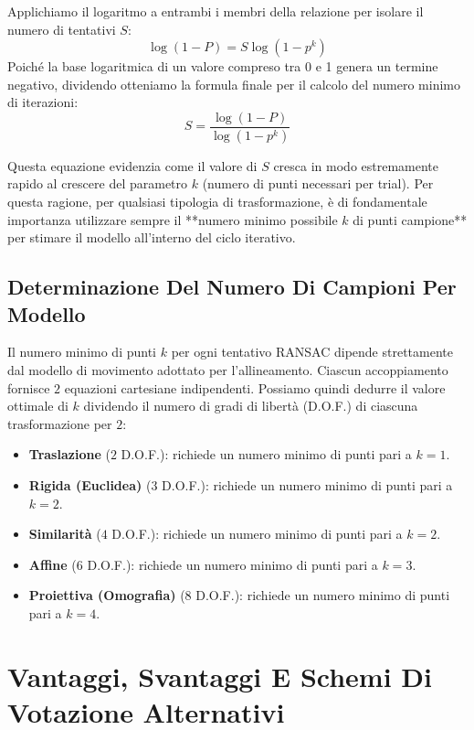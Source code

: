 ﻿\documentclass[11pt, a4paper]{article}
\begin{document}
Applichiamo il logaritmo a entrambi i membri della relazione per isolare il numero di tentativi $S$:
\[
\log(1 - P) = S \log\left(1 - p^k\right)
\]
Poiché la base logaritmica di un valore compreso tra 0 e 1 genera un termine negativo, dividendo otteniamo la formula finale per il calcolo del numero minimo di iterazioni:
\[
\boxed{S = \frac{\log(1 - P)}{\log\left(1 - p^k\right)}}
\]

Questa equazione evidenzia come il valore di $S$ cresca in modo estremamente rapido al crescere del parametro $k$ (numero di punti necessari per trial). Per questa ragione, per qualsiasi tipologia di trasformazione, è di fondamentale importanza utilizzare sempre il **numero minimo possibile $k$ di punti campione** per stimare il modello all'interno del ciclo iterativo.

\subsection{Determinazione Del Numero Di Campioni Per Modello}

Il numero minimo di punti $k$ per ogni tentativo RANSAC dipende strettamente dal modello di movimento adottato per l'allineamento. Ciascun accoppiamento fornisce $2$ equazioni cartesiane indipendenti. Possiamo quindi dedurre il valore ottimale di $k$ dividendo il numero di gradi di libertà (D.O.F.) di ciascuna trasformazione per $2$:
\begin{itemize}[noitemsep]
    \item \textbf{Traslazione} ($2$ D.O.F.): richiede un numero minimo di punti pari a $k = 1$.
    \item \textbf{Rigida (Euclidea)} ($3$ D.O.F.): richiede un numero minimo di punti pari a $k = 2$.
    \item \textbf{Similarità} ($4$ D.O.F.): richiede un numero minimo di punti pari a $k = 2$.
    \item \textbf{Affine} ($6$ D.O.F.): richiede un numero minimo di punti pari a $k = 3$.
    \item \textbf{Proiettiva (Omografia)} ($8$ D.O.F.): richiede un numero minimo di punti pari a $k = 4$.
\end{itemize}

\newpage

\section{Vantaggi, Svantaggi E Schemi Di Votazione Alternativi}
\end{document}
